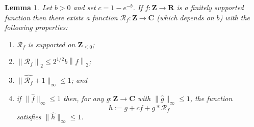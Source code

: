 \documentclass[reqno]{amsart}
\renewcommand{\leq}{\leqslant}
\newcommand{\ri}{\mathcal{R}}
\newcommand{\bbz}{\mathbf{Z}}
\newcommand{\bbr}{\mathbf{R}}
\newcommand{\bbc}{\mathbf{C}}
\newcommand{\norm}[1]{\left\lVert #1\right\rVert}
\numberwithin{equation}{section}
\newtheorem{lemma}[theorem]{Lemma}
\theoremstyle{definition}
\theoremstyle{remark}
\begin{document}
\begin{lemma}\label{lem-MPS}
Let $b>0$ and set $c=1-e^{-b}$. If $f:\bbz \to \bbr$ is a finitely supported function then there exists a function $\ri_f:\bbz\to \bbc$ \textup{(}which depends on $b$\textup{)} with the following properties:
\begin{enumerate}
\item $\ri_f$ is supported on $\bbz_{\leq 0}$;
\item $\norm{\ri_f}_2\leq 2^{1/2}b\norm{f}_2$;
\item $\|\widehat{\ri_f}+1\|_\infty\leq 1$; and 
\item if $\|\widehat{f}\|_\infty\leq 1$ then, for any $g:\bbz\to \bbc$ with $\| \widehat{g}\|_\infty\leq 1$, the function
\[h :=g+cf+g\ast \ri_f\]
satisfies $\| \widehat{h}\|_\infty \leq 1$.
\end{enumerate}
\end{lemma}
\end{document}
